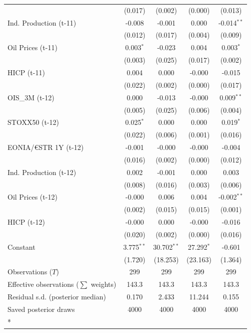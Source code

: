 \begin{longtable}[t]{lcccc}
 & (0.017) & (0.002) & (0.000) & (0.013)\\
Ind. Production (t-11) & -0.008 & -0.001 & 0.000 & -0.014$^{**}$\\
 & (0.012) & (0.017) & (0.004) & (0.009)\\
Oil Prices (t-11) & 0.003$^{*}$ & -0.023 & 0.004 & 0.003$^{*}$\\
 & (0.003) & (0.025) & (0.017) & (0.002)\\
HICP (t-11) & 0.004 & 0.000 & -0.000 & -0.015\\
 & (0.022) & (0.002) & (0.000) & (0.017)\\
OIS\_3M (t-12) & 0.000 & -0.013 & -0.000 & 0.009$^{**}$\\
 & (0.005) & (0.025) & (0.006) & (0.004)\\
STOXX50 (t-12) & 0.025$^{*}$ & 0.000 & 0.000 & 0.019$^{*}$\\
 & (0.022) & (0.006) & (0.001) & (0.016)\\
EONIA/€STR 1Y (t-12) & -0.001 & -0.000 & -0.000 & -0.004\\
 & (0.016) & (0.002) & (0.000) & (0.012)\\
Ind. Production (t-12) & 0.002 & -0.001 & 0.000 & 0.003\\
 & (0.008) & (0.016) & (0.003) & (0.006)\\
Oil Prices (t-12) & -0.000 & 0.006 & 0.004 & -0.002$^{**}$\\
 & (0.002) & (0.015) & (0.015) & (0.001)\\
HICP (t-12) & -0.000 & 0.000 & -0.000 & -0.016\\
 & (0.020) & (0.002) & (0.000) & (0.016)\\
Constant & 3.775$^{**}$ & 30.702$^{**}$ & 27.292$^{*}$ & -0.601\\
 & (1.720) & (18.253) & (23.163) & (1.364)\\
\midrule
Observations ($T$) & 299 & 299 & 299 & 299\\
Effective observations ($\sum$ weights) & 143.3 & 143.3 & 143.3 & 143.3\\
Residual s.d. (posterior median) & 0.170 & 2.433 & 11.244 & 0.155\\
Saved posterior draws & 4000 & 4000 & 4000 & 4000\\*
\end{longtable}
\endgroup{}

\begingroup\fontsize{7}{9}\selectfont

